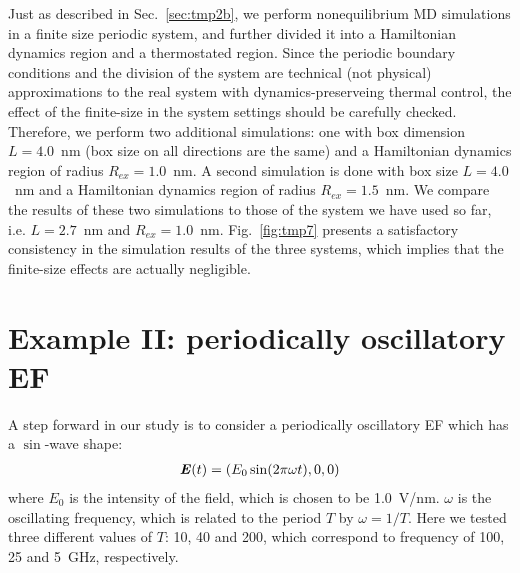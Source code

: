 \documentclass[a4paper,preprint,unsortedaddress,onecolumn]{revtex4-1}
\newcommand{\vect}[1]{\textbf{\textit{#1}}}
\begin{document}
Just as described in Sec.~\ref{sec:tmp2b}, we perform nonequilibrium MD
simulations in a finite size periodic system, and further divided it
into a Hamiltonian dynamics region and a thermostated region.
Since the periodic boundary conditions and the division of the system
are technical (not physical) approximations to the real system with dynamics-preserveing thermal control, 
the effect of the finite-size in 
the system settings should be carefully checked.
Therefore, we
perform two additional simulations: one with box dimension $L=4.0$~nm (box size on all directions are the same) and a
Hamiltonian dynamics region of radius $R_{ex} = 1.0$~nm. A second simulation is done with box size $L=4.0$~nm and a Hamiltonian dynamics region of
radius $R_{ex} = 1.5$~nm. We compare the results of these two simulations to those of the system we have used so far, i.e. $L=2.7$~nm and $R_{ex} = 1.0$~nm.
Fig.~\ref{fig:tmp7} presents a satisfactory consistency in
the simulation results of the three systems, which implies that the finite-size effects are
actually negligible.



\section{Example II:
  periodically oscillatory EF}

A step forward in our study is to consider a periodically oscillatory EF which has
a $\sin$-wave shape:
\begin{align}
  \vect E(t) = (E_0\sin(2\pi \omega t), 0, 0)
\end{align}
where $E_0$ is the intensity of the field, which is chosen to be
1.0~V/nm.  $\omega$ is the oscillating frequency, which is related to
the period $T$ by $\omega = 1/T$.  Here we tested three different
values of $T$: 10, 40 and 200, which correspond
to frequency of 100, 25 and 5~GHz, respectively.
\end{document}
